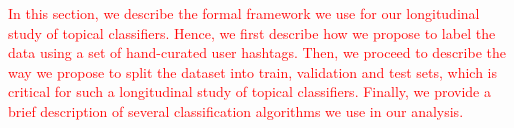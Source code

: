 
\textcolor{red}{In this section, we describe the formal framework we use for our longitudinal study of topical classifiers. Hence, we first describe how we propose to label the data using a set of hand-curated user hashtags. Then, we proceed to describe the way we propose to split the dataset into train, validation and test sets, which is critical for such a longitudinal study of topical classifiers. 
Finally, we provide a brief description of several classification algorithms we use in our analysis.
}



